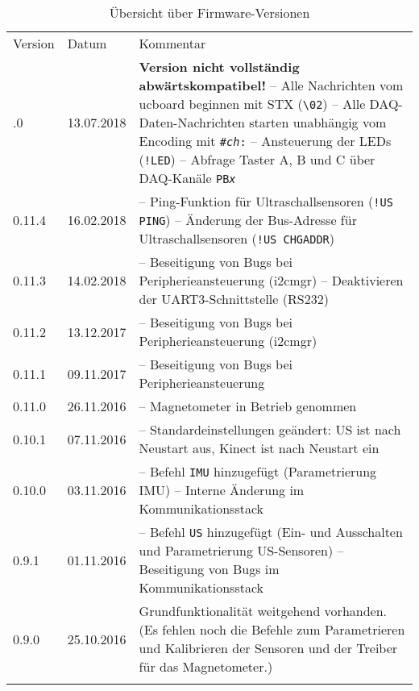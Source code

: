 \begin{table}[htbp]%
	\centering
	\caption{Übersicht über Firmware-Versionen}
	\label{tab:repo:fw_versions}
	\begin{tabular}{llp{10cm}}
		\mytoprule
		Version & Datum & Kommentar \\
		\mymidrule
		0.12.0
			& 13.07.2018
			& \textbf{Version nicht vollständig abwärtskompatibel!} \newline
				-- Alle Nachrichten vom ucboard beginnen mit STX (\verb|\02|) \newline
				-- Alle DAQ-Daten-Nachrichten starten unabhängig vom Encoding mit \texttt{\#\textit{ch}:} \newline
				-- Ansteuerung der LEDs (\verb|!LED|) \newline
				-- Abfrage Taster A, B und C über DAQ-Kanäle \texttt{PB\textit{x}} \\		
		0.11.4
			& 16.02.2018
			& -- Ping-Funktion für Ultraschallsensoren (\verb|!US PING|) \newline 
				-- Änderung der Bus-Adresse für Ultraschallsensoren (\verb|!US CHGADDR|)\\		
		0.11.3
			& 14.02.2018
			& -- Beseitigung von Bugs bei Peripherieansteuerung (i2cmgr) \newline 
				-- Deaktivieren der UART3-Schnittstelle (RS232) \\
		0.11.2
			& 13.12.2017
			& -- Beseitigung von Bugs bei Peripherieansteuerung (i2cmgr) \\
		0.11.1
			& 09.11.2017
			& -- Beseitigung von Bugs bei Peripherieansteuerung \\
		0.11.0
			& 26.11.2016
			& -- Magnetometer in Betrieb genommen \\
		0.10.1
			& 07.11.2016
			& -- Standardeinstellungen geändert: US ist nach Neustart aus, Kinect ist nach Neustart ein \\
		0.10.0
			& 03.11.2016
			& -- Befehl \verb|IMU| hinzugefügt (Parametrierung IMU) \newline
				-- Interne Änderung im Kommunikationsstack \\
		0.9.1
			& 01.11.2016
			& -- Befehl \verb|US| hinzugefügt (Ein- und Ausschalten und Parametrierung US-Sensoren) \newline
				-- Beseitigung von Bugs im Kommunikationsstack \\
		0.9.0
			& 25.10.2016
			& Grundfunktionalität weitgehend vorhanden. (Es fehlen noch die Befehle zum Parametrieren und Kalibrieren der Sensoren und der Treiber für das Magnetometer.) \\
		\mybottomrule
	\end{tabular}
\end{table}



